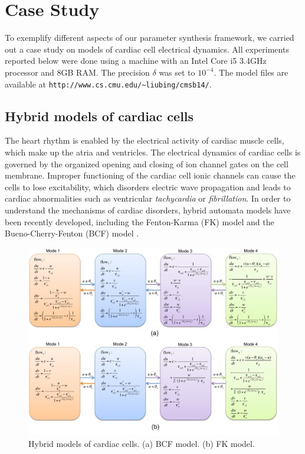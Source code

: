 \section{Case Study}

To exemplify different aspects of our parameter synthesis framework, we carried out a case study on
models of cardiac cell electrical dynamics. All experiments reported below were done
using a machine with an Intel Core i5 3.4GHz processor and 8GB RAM. The precision $\delta$
was set to $10^{-4}$. The model files are available at \verb#http://www.cs.cmu.edu/~liubing/cmsb14/#.


\subsection{Hybrid models of cardiac cells}
The heart rhythm is enabled by the electrical activity of cardiac muscle cells, which make up the atria and ventricles. The electrical dynamics of cardiac cells is governed by the organized opening and closing of ion channel gates on the cell membrane. Improper functioning of the cardiac cell ionic channels can cause the cells to lose excitability, which disorders electric wave propagation and leads to cardiac abnormalities such as ventricular \textit{tachycardia} or \textit{fibrillation}. In order to understand the mechanisms of cardiac disorders,
hybrid automata models have been recently developed, including the Fenton-Karma (FK) model \cite{fenton98} and the Bueno-Cherry-Fenton (BCF) model \cite{orovio08}.
\begin{figure}[t]
\centering
\includegraphics[scale=0.5]{fig-cardiac-new}
\caption{Hybrid models of cardiac cells. (a) BCF model. (b) FK model.}
\label{model}
\vspace{-2ex}
\end{figure}

